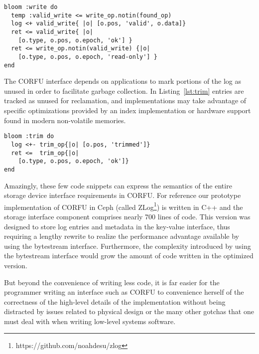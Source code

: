 \begin{lstlisting}[caption={Write}, label=lst:write]
bloom :write do
  temp :valid_write <= write_op.notin(found_op)
  log <+ valid_write{ |o| [o.pos, 'valid', o.data]}
  ret <= valid_write{ |o|
    [o.type, o.pos, o.epoch, 'ok'] }
  ret <= write_op.notin(valid_write) {|o|
    [o.type, o.pos, o.epoch, 'read-only'] }
end
\end{lstlisting}

The CORFU interface depends on applications to mark portions of the log as
unused in order to facilitate garbage collection.  In Listing~\ref{lst:trim}
entries are tracked as unused for reclamation, and implementations may take
advantage of specific optimizations provided by an index implementation or
hardware support found in modern non-volatile memories.

\begin{lstlisting}[caption={Trim}, label=lst:trim]
bloom :trim do
  log <+- trim_op{|o| [o.pos, 'trimmed']}
  ret <=  trim_op{|o|
    [o.type, o.pos, o.epoch, 'ok']}
end
\end{lstlisting}

Amazingly, these few code snippets can express the semantics of the entire
storage device interface requirements in CORFU. For reference our prototype
implementation of CORFU in Ceph (called
ZLog\footnote{https://github.com/noahdesu/zlog}) is written in C++ and the
storage interface component comprises nearly 700 lines of code. This version
was designed to store log entries and metadata in the key-value interface,
thus requiring a lengthy rewrite to realize the performance advantage
available by using the bytestream interface.
Furthermore, the complexity introduced by using the
bytestream interface would grow the amount of code written in the optimized
version.

But beyond the convenience of writing less code, it is far easier for the
programmer writing an interface such as CORFU to convenience herself of the
correctness of the high-level details of the implementation without being
distracted by issues related to physical design or the many other gotchas that
one must deal with when writing low-level systems software.
